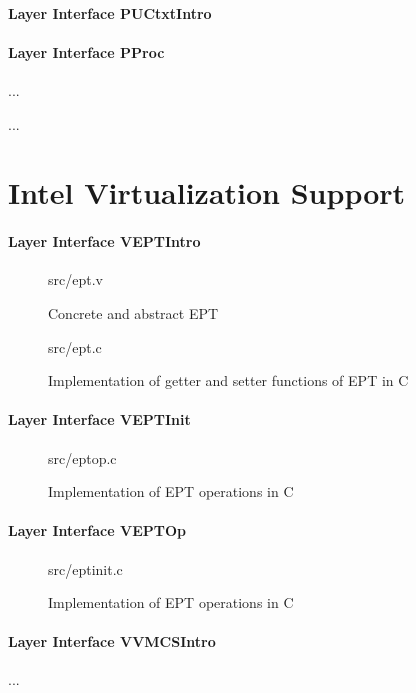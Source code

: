 \paragraph{Layer Interface PUCtxtIntro}



\paragraph{Layer Interface PProc}
...

...

\section{Intel Virtualization Support}

\paragraph{Layer Interface VEPTIntro}

\begin{figure}
	 {src/ept.v}
	\caption{Concrete and abstract EPT}
	\label{fig:ept_v}
\end{figure}


\begin{figure}
	 {src/ept.c}
	\caption{Implementation of getter and setter functions of EPT in C}
	\label{fig:ept_c}
\end{figure}

\paragraph{Layer Interface VEPTInit}


\begin{figure}
	 {src/eptop.c}
	\caption{Implementation of EPT operations in C}
	\label{fig:eptop_c}
\end{figure}

\paragraph{Layer Interface VEPTOp}

\begin{figure}
	 {src/eptinit.c}
	\caption{Implementation of EPT operations in C}
	\label{fig:eptinit_c}
\end{figure}

\paragraph{Layer Interface VVMCSIntro}
...

